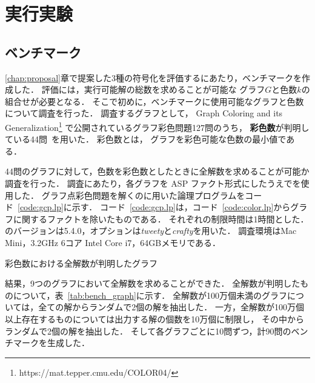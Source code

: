 \section{実行実験} \label{chap:experiment}

\subsection{ベンチマーク}
\ref{chap:proposal}章で提案した3種の符号化を評価するにあたり，ベンチマークを作成した．
評価には，実行可能解の総数を求めることが可能な
グラフ$G$と色数$k$の組合せが必要となる．
そこで初めに，ベンチマークに使用可能なグラフと色数について調査を行った．
調査するグラフとして，
Graph Coloring and its Generalization\footnote{https://mat.tepper.cmu.edu/COLOR04/}
で公開されているグラフ彩色問題127問のうち，
\textbf{彩色数}が判明している44問~\cite{DBLP:journals/constraints/TamuraTKB09}を用いた．
彩色数とは， グラフを彩色可能な色数の最小値である．

44問のグラフに対して，色数を彩色数としたときに全解数を求めることが可能か調査を行った．
調査にあたり，各グラフを ASP ファクト形式にしたうえで{\clingo}を使用した．
グラフ点彩色問題を解くのに用いた論理プログラムをコード~\ref{code:gcp.lp}に示す．
コード~\ref{code:gcp.lp}は，コード~\ref{code:color.lp}からグラフに関するファクトを除いたものである．
それぞれの制限時間は1時間とした．
{\clingo}のバージョンは5.4.0，オプションは\textsl{tweety}と\textsl{crafty}を用いた．
調査環境はMac Mini，3.2GHz 6コア Intel Core i7，64GBメモリである．



\begin{table}[tb]
  \centering
  \caption{彩色数における全解数が判明したグラフ}
  
  \label{tab:bench_graph}
\end{table}

結果，9つのグラフにおいて全解数を求めることができた．
全解数が判明したものについて，表~\ref{tab:bench_graph}に示す．
全解数が100万個未満のグラフについては，全ての解からランダムで2個の解を抽出した．
一方，全解数が100万個以上存在するものについては出力する解の個数を10万個に制限し，
その中からランダムで2個の解を抽出した．
そして各グラフごとに10問ずつ，計90問のベンチマークを生成した．

